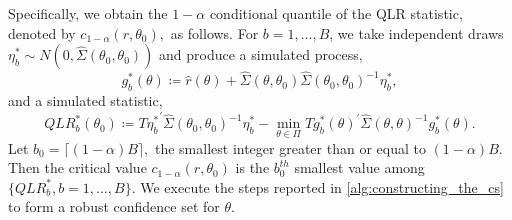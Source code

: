 Specifically, we obtain the $1-\alpha $ conditional quantile of the QLR statistic, denoted by $c_{1-\alpha }(r,\theta _{0}),$ as follows. For $b=1,\ldots,B$, we take independent draws $\eta _{b}^{\ast }\sim N(0,\widehat{\Sigma }(\theta _{0},\theta _{0}))$ and produce a simulated process, 
%
\begin{equation}
    g_{b}^{\ast }(\theta ) \coloneqq \widehat{r}(\theta ) + \widehat{\Sigma }(\theta ,\theta _{0})\widehat{\Sigma }(\theta _{0},\theta _{0})^{-1}\eta _{b}^{\ast},
\end{equation}
%
and a simulated statistic,
%
\begin{equation}
    QLR_{b}^{\ast }(\theta _{0}) \coloneqq T  {\eta_{b}^{\ast}}^{\prime} \widehat{\Sigma} (\theta _{0},\theta _{0})^{-1} \eta_{b}^{\ast} -   \underset{\theta \in \Pi }{\min }Tg_b^{\ast }(\theta )^{\prime }\widehat{\Sigma } (\theta ,\theta )^{-1}g_{b}^{\ast }(\theta ).
\end{equation}
%
Let $b_{0}=\lceil (1-\alpha )B\rceil ,$ the smallest integer greater than or equal to $(1-\alpha )B$. Then the critical value $c_{1-\alpha }(r,\theta _{0})$ is the $b_{0}^{th}$ smallest value among $\{QLR_{b}^{\ast },b=1,\ldots,B\}$.
We execute the steps reported in \cref{alg:constructing_the_cs} to form a robust confidence set for $\theta$.

